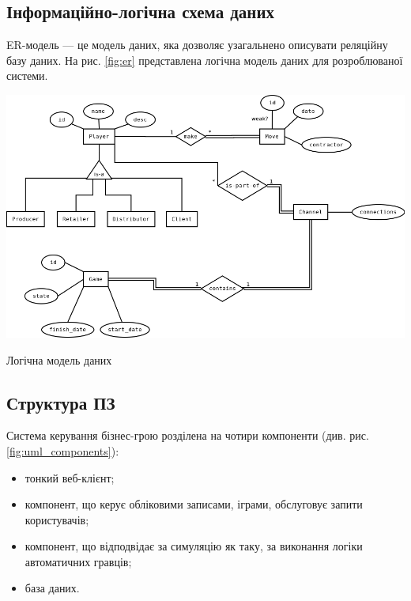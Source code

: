 \subsection{Інформаційно-логічна схема даних}
ER-модель --- це модель даних, яка дозволяє узагальнено описувати реляційну базу даних. На рис. \ref{fig:er} представлена логічна модель даних для розроблюваної системи.

\begin{stdfigure}
    \includegraphics[width=7in]{images/er.png}
    \caption{Логічна модель даних}
    \label{fig:er}
\end{stdfigure}   

\subsection{Структура ПЗ}
Система керування бізнес-грою розділена на чотири компоненти (див. рис. \ref{fig:uml_components}): 
\begin{itemize}
\item тонкий веб-клієнт;
\item компонент, що керує обліковими записами, іграми, обслуговує запити користувачів;
\item компонент, що відподвідає за симуляцію як таку, за виконання логіки автоматичних гравців;
\item база даних.
\end{itemize}

